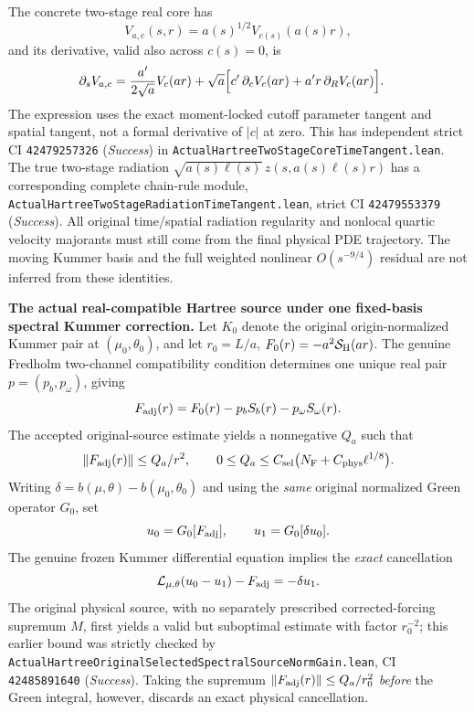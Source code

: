 \documentclass[11pt]{amsart}
\begin{document}
The concrete two-stage real core has
\[
 V_{a,c}(s,r)=a(s)^{1/2}V_{c(s)}(a(s)r),
\]
and its derivative, valid also across \(c(s)=0\), is
\begin{align}
 \partial_s V_{a,c}
 &=\frac{a'}{2\sqrt a}V_c(ar)
 +\sqrt a\Bigl[
       c'\,\partial_cV_c(ar)+a'r\,\partial_RV_c(ar)
       \Bigr].
 \label{eq:hbl-two-stage-core-time-tangent}
\end{align}
The expression uses the exact moment-locked cutoff parameter
tangent and spatial tangent, not a formal derivative of
\(|c|\) at zero. This has independent strict CI
\texttt{42479257326} (\emph{Success}) in
\texttt{ActualHartreeTwoStageCoreTimeTangent.lean}.
The true two-stage radiation
\(\sqrt{a(s)\ell(s)}\,z(s,a(s)\ell(s)r)\)
has a corresponding complete chain-rule module,
\texttt{ActualHartreeTwoStageRadiationTimeTangent.lean},
strict CI \texttt{42479553379} (\emph{Success}). All original time/spatial radiation
regularity and nonlocal quartic velocity majorants must still
come from the final physical PDE trajectory.
The moving Kummer basis and the full weighted nonlinear
\(O(s^{-9/4})\) residual are not inferred from these identities.


\medskip
\noindent\textbf{The actual real-compatible Hartree source under one
fixed-basis spectral Kummer correction.}
Let \(K_0\) denote the original origin-normalized Kummer pair at
\((\mu_0,\theta_0)\), and let
\(r_0=L/a\), \(F_0(r)=-a^2\mathcal S_{\rm H}(ar)\).
The genuine Fredholm two-channel compatibility condition determines
one unique real pair \(p=(p_b,p_\omega)\), giving
\[
 F_{\rm adj}(r)=F_0(r)-p_bS_b(r)-p_\omega S_\omega(r).
\]
The accepted original-source estimate yields a nonnegative \(Q_a\)
such that
\[
 \|F_{\rm adj}(r)\|\le Q_a/r^2,\qquad
 0\le Q_a\le C_{\rm sel}
   \bigl(N_{\rm F}+C_{\rm phys}\ell^{1/8}\bigr).
\]
Writing
\(
 \delta=b(\mu,\theta)-b(\mu_0,\theta_0)
\)
and using the \emph{same} original normalized Green operator \(G_0\),
set
\[
 u_0=G_0[F_{\rm adj}],\qquad
 u_1=G_0[\delta u_0].
\]
The genuine frozen Kummer differential equation implies the
\emph{exact} cancellation
\[
 {\cal L}_{\mu,\theta}(u_0-u_1)
      -F_{\rm adj}=-\delta u_1.
\]
The original physical source, with no separately prescribed
corrected-forcing supremum \(M\), first yields a valid but
suboptimal estimate with factor \(r_0^{-2}\);
this earlier bound was strictly checked by
\texttt{ActualHartreeOriginalSelectedSpectralSourceNormGain.lean},
CI \texttt{42485891640} (\emph{Success}).
Taking the supremum \(\|F_{\rm adj}(r)\|\le Q_a/r_0^2\)
\emph{before} the Green integral, however, discards an exact
physical cancellation.
\end{document}
